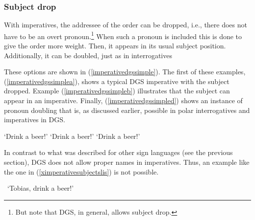 \subsubsection{Subject drop}
With imperatives, the addressee of the order can be dropped, i.e., there does not have to be an overt pronoun.\footnote{But note that DGS, in general, allows subject drop.} When such a pronoun is included this is done to give the order more weight. Then, it appears in its usual subject position. Additionally, it can be doubled, just as in interrogatives

These options are shown in (\ref{imperativedgssimple}). The first of these examples, (\ref{imperativedgssimplea}), shows a typical DGS imperative with the subject dropped. Example (\ref{imperativedgssimpleb}) illustrates that the subject can appear in an imperative. Finally, (\ref{imperativedgssimpled}) shows an instance of pronoun doubling that is, as discussed earlier, possible in polar interrogatives and imperatives in DGS.

\begin{exe}
\ex\label{imperativedgssimple}\begin{xlist}
\ex {}
%
\glt `Drink a beer!' \label{imperativedgssimplea}
\ex {}
%
\glt `Drink a beer!' \label{imperativedgssimpleb}
\ex {}
%
\glt `Drink a beer!' \label{imperativedgssimpled}
\end{xlist}
\end{exe}

\noindent In contrast to what was described for other sign languages (see the previous section), DGS does not allow proper names in imperatives. Thus, an example like the one in (\ref{ximperativesubjectslis}) is not possible.


\begin{exe}
\ex *
\glt \textcolor{white}{*}`Tobias, drink a beer!' \label{ximperativesubjectslis}
\end{exe}

